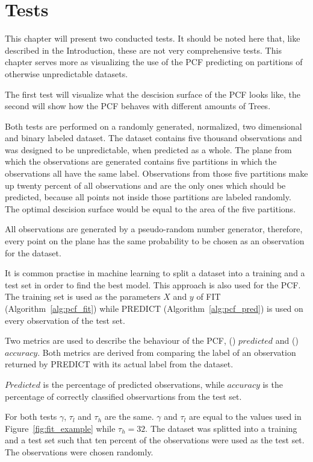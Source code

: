\section{Tests}
\label{sec:tests}

This chapter will present two conducted tests. It should
be noted here that, like described in the Introduction,
these are not very comprehensive tests. This chapter serves
more as visualizing the use of the PCF predicting on
partitions of otherwise unpredictable datasets.

The first test will visualize what the descision surface of
the PCF looks like, the second will show how the PCF
behaves with different amounts of Trees.

Both tests are performed on a randomly generated,
normalized, two dimensional and binary labeled dataset. The
dataset contains five thousand observations and was
designed to be unpredictable, when predicted as a whole.
The plane from which the observations are generated
contains five partitions in which the observations all have
the same label. Observations from those five partitions
make up twenty percent of all observations and are the only
ones which should be predicted, because all points not
inside those partitions are labeled randomly. The optimal
descision surface would be equal to the area of the five
partitions.

All observations are generated by a pseudo-random number
generator, therefore, every point on the plane has the same
probability to be chosen as an observation for the dataset.

It is common practise in machine learning to split a
dataset into a training and a test set in order to find
the best model. This approach is also used for the PCF.
The training set is used as the parameters $X$ and $y$ of
FIT (Algorithm~\ref{alg:pcf_fit}) while PREDICT
(Algorithm~\ref{alg:pcf_pred}) is used on every observation
of the test set.

Two metrics are used to describe the behaviour of the PCF,
() $predicted$ and ()
$accuracy$. Both metrics are derived from comparing the
label of an observation returned by PREDICT with its actual
label from the dataset.

$Predicted$ is the percentage of predicted observations,
while $accuracy$ is the percentage of correctly classified
observartions from the test set.

For both tests $\gamma$, $\tau_l$ and $\tau_h$ are the
same. $\gamma$ and $\tau_l$ are equal to the values used in
Figure~\ref{fig:fit_example} while $\tau_h = 32$. The
dataset was splitted into a training and a test set such
that ten percent of the observations were used as the test
set. The observations were chosen randomly.

